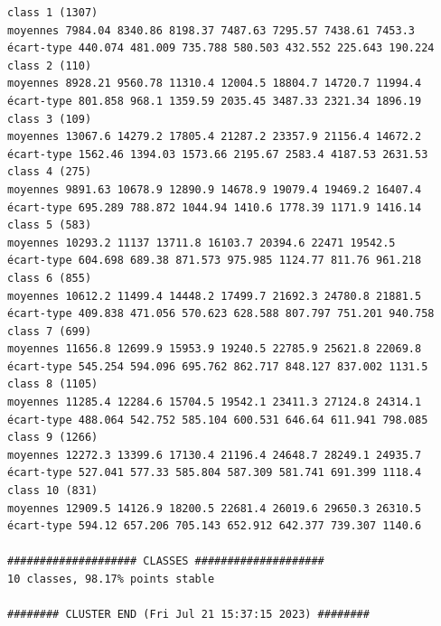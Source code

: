 \documentclass[environments,article,submit,pdftex,moreauthors]{Definitions/mdpi}
\begin{document}
\begin{scriptsize}
\begin{verbatim}
class 1 (1307)
moyennes 7984.04 8340.86 8198.37 7487.63 7295.57 7438.61 7453.3
écart-type 440.074 481.009 735.788 580.503 432.552 225.643 190.224
class 2 (110)
moyennes 8928.21 9560.78 11310.4 12004.5 18804.7 14720.7 11994.4
écart-type 801.858 968.1 1359.59 2035.45 3487.33 2321.34 1896.19
class 3 (109)
moyennes 13067.6 14279.2 17805.4 21287.2 23357.9 21156.4 14672.2
écart-type 1562.46 1394.03 1573.66 2195.67 2583.4 4187.53 2631.53
class 4 (275)
moyennes 9891.63 10678.9 12890.9 14678.9 19079.4 19469.2 16407.4
écart-type 695.289 788.872 1044.94 1410.6 1778.39 1171.9 1416.14
class 5 (583)
moyennes 10293.2 11137 13711.8 16103.7 20394.6 22471 19542.5
écart-type 604.698 689.38 871.573 975.985 1124.77 811.76 961.218
class 6 (855)
moyennes 10612.2 11499.4 14448.2 17499.7 21692.3 24780.8 21881.5
écart-type 409.838 471.056 570.623 628.588 807.797 751.201 940.758
class 7 (699)
moyennes 11656.8 12699.9 15953.9 19240.5 22785.9 25621.8 22069.8
écart-type 545.254 594.096 695.762 862.717 848.127 837.002 1131.5
class 8 (1105)
moyennes 11285.4 12284.6 15704.5 19542.1 23411.3 27124.8 24314.1
écart-type 488.064 542.752 585.104 600.531 646.64 611.941 798.085
class 9 (1266)
moyennes 12272.3 13399.6 17130.4 21196.4 24648.7 28249.1 24935.7
écart-type 527.041 577.33 585.804 587.309 581.741 691.399 1118.4
class 10 (831)
moyennes 12909.5 14126.9 18200.5 22681.4 26019.6 29650.3 26310.5
écart-type 594.12 657.206 705.143 652.912 642.377 739.307 1140.6

#################### CLASSES ####################
10 classes, 98.17% points stable

######## CLUSTER END (Fri Jul 21 15:37:15 2023) ########
\end{verbatim}
\end{scriptsize}
\end{document}

